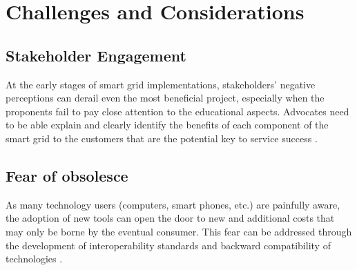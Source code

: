 \section{Challenges and Considerations  }  
\subsection{Stakeholder Engagement}
At the early stages of smart grid implementations, stakeholders’ negative perceptions can derail even the most beneficial project, especially when the proponents fail to pay close attention to the educational aspects. Advocates need to be able explain and clearly identify the benefits of each component of the smart grid to the customers that are the potential key to service success \cite{el2014smart}.
\subsection{Fear of obsolesce}
As many technology users (computers, smart phones, etc.) are painfully aware, the adoption of new tools can open the door to new and additional costs that may only be borne by the eventual consumer. This fear can be addressed through the development of interoperability standards and backward compatibility of technologies \cite{el2014smart}.

